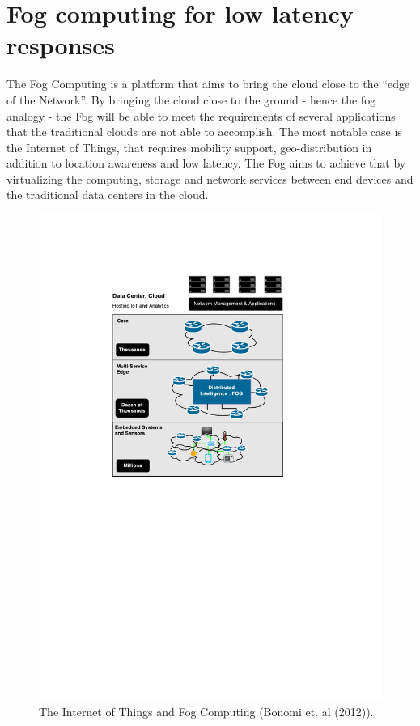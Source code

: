 \section{Fog computing for low latency responses}
\label{sec:fog_computing}
The Fog Computing \cite{bonomi2012fog} is a platform that aims to bring the cloud close to the ``edge
of the Network''. By bringing the cloud close to the ground - hence the fog analogy - the Fog will be
able to meet the requirements of several applications that the traditional clouds are not able to
accomplish. The most notable case is the Internet of Things, that requires mobility support,
geo-distribution in addition to location awareness and low latency. The Fog aims to achieve that by
virtualizing the computing, storage and network services between end devices and the
traditional data centers in the cloud.\\

\begin{figure}[ht!]
  \centering
  \includegraphics[width=.8\textwidth]{./images/fog_architecture}
  \caption[IoT and Fog Computing.]{The Internet of Things and Fog Computing (Bonomi et. al (2012)).}
  \label{fig:fog_architecture}
\end{figure}

